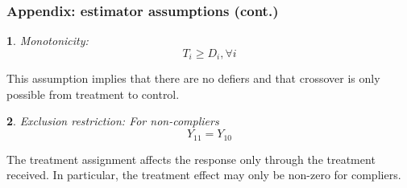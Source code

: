 \documentclass{beamer}
\makeatletter
\newtheorem*{assumption*}{\assumptionnumber}
\providecommand{\assumptionnumber}{}
\newenvironment{assumption}[2]
 {%
  \renewcommand{\assumptionnumber}{Assumption #1}%
  \begin{assumption*}%
  \protected@edef\@currentlabel{#1}%
 }
 {%
  \end{assumption*}
 }
\makeatother
\begin{document}
\begin{frame}
\frametitle{Appendix: estimator assumptions (cont.)}
\begin{assumption}{6}{}\label{monotonicity}
Monotonicity: 
\begin{equation*}
T_i \geq D_i, \forall i
\end{equation*}
\end{assumption}
\noindent This assumption implies that there are no defiers and that crossover is only possible from treatment to control.
\begin{assumption}{7}{}\label{ER}
Exclusion restriction: For non-compliers
\begin{equation*}
Y_{11} = Y_{10}
\end{equation*}  
\end{assumption}
\noindent The treatment assignment affects the response only through the treatment received.  In particular, the treatment effect may only be non-zero for compliers.  
\end{frame}



		
\end{document}
